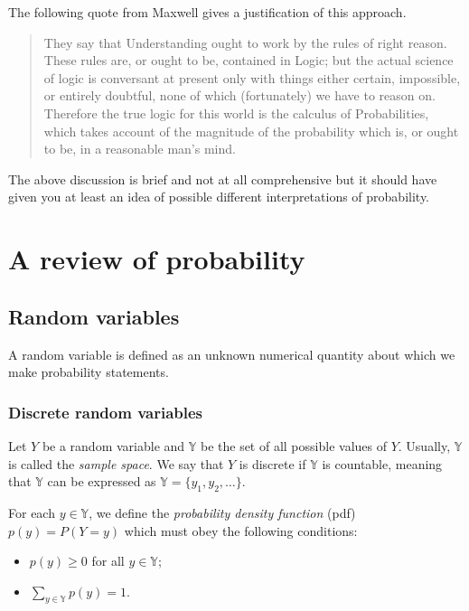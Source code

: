 \documentclass[
]{book}
\begin{document}
The following quote from Maxwell gives a justification of this approach.

\begin{quote}
They say that Understanding ought to work by the rules of right reason. These rules are, or ought to be, contained in Logic; but the actual science of logic is conversant at present only with things either certain, impossible, or entirely doubtful, none of which (fortunately) we have to reason on. Therefore the true logic for this world is the calculus of Probabilities, which takes account of the magnitude of the probability which is, or ought to be, in a reasonable man's mind.
\end{quote}

The above discussion is brief and not at all comprehensive but it should have given you at least an idea of possible different interpretations of probability.

\hypertarget{a-review-of-probability}{%
\section{A review of probability}\label{a-review-of-probability}}

\hypertarget{random-variables}{%
\subsection{Random variables}\label{random-variables}}

A random variable is defined as an unknown numerical quantity about which we make probability statements.

\hypertarget{discrete-random-variables}{%
\subsubsection{Discrete random variables}\label{discrete-random-variables}}

Let \(Y\) be a random variable and \(\mathbb{Y}\) be the set of all possible values of \(Y\). Usually, \(\mathbb{Y}\) is called the \emph{sample space}. We say that \(Y\) is discrete if \(\mathbb{Y}\) is countable, meaning that \(\mathbb{Y}\) can be expressed as \(\mathbb{Y} = \{y_1, y_2,\dots\}\).

For each \(y\in\mathbb{Y}\), we define the \emph{probability density function} (pdf) \(p(y)=P(Y=y)\) which must obey the following conditions:

\begin{itemize}
\item
  \(p(y)\geq 0\) for all \(y\in\mathbb{Y}\);
\item
  \(\sum_{y\in\mathbb{Y}}p(y)=1\).
\end{itemize}
\end{document}
